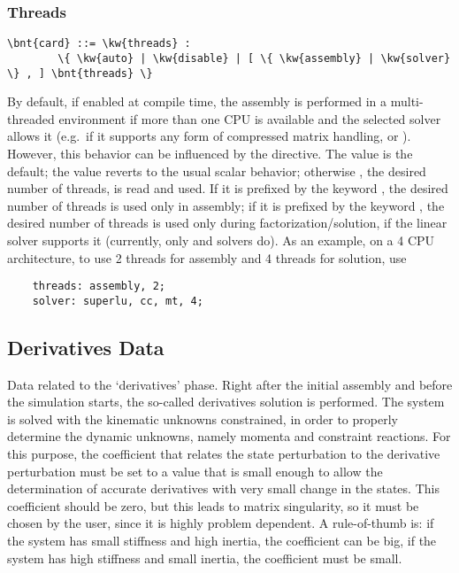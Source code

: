 \subsubsection{Threads}   
\begin{Verbatim}[commandchars=\\\{\}]
    \bnt{card} ::= \kw{threads} :
        \{ \kw{auto} | \kw{disable} | [ \{ \kw{assembly} | \kw{solver} \} , ] \bnt{threads} \}
\end{Verbatim}
By default, if enabled at compile time, the assembly is performed
in a multi-threaded environment if more than one CPU is available 
and the selected solver allows it (e.g.\ if it supports any form 
of compressed matrix handling,  or ).
However, this behavior can be influenced by the  directive.
The value  is the default; the value  reverts
to the usual scalar behavior; otherwise , the desired 
number of threads, is read and used.
If it is prefixed by the keyword , the desired number
of threads is used only in assembly; if it is prefixed by the keyword
, the desired number of threads is used only during 
factorization/solution, if the linear solver supports it (currently,
only  and  solvers do).
As an example, on a 4 CPU architecture, to use 2 threads for assembly
and 4 threads for solution, use
\begin{verbatim}
    threads: assembly, 2;
    solver: superlu, cc, mt, 4;
\end{verbatim}





\subsection{Derivatives Data}
Data related to the `derivatives' phase.
Right after the initial assembly and before the simulation starts, the
so-called derivatives solution is performed. The system is solved with
the kinematic unknowns constrained, in order to properly determine the
dynamic unknowns, namely momenta and constraint reactions. For this
purpose, the coefficient that relates the state perturbation to the
derivative perturbation must be set to a value that is small enough to
allow the determination of accurate derivatives with very small change
in the states. This coefficient should be zero, but this leads to matrix
singularity, so it must be chosen by the user, since it is highly
problem dependent. A rule-of-thumb is: if the system has small
stiffness and high inertia, the coefficient can be big, if the system
has high stiffness and small inertia, the coefficient must be small.

